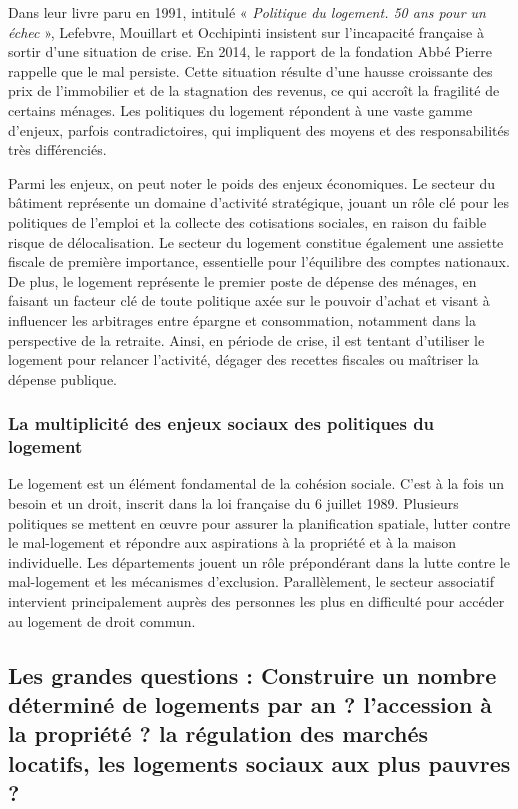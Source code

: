 \documentclass[a4paper, 12pt]{report}
\begin{document}
Dans leur livre paru en 1991, intitulé « \textit{Politique du logement. 50 ans pour un échec }», Lefebvre, Mouillart et Occhipinti insistent sur l’incapacité française à sortir d’une situation de crise. En 2014, le rapport de la fondation Abbé Pierre rappelle que le mal persiste. Cette situation résulte d’une hausse croissante des prix de l’immobilier et de la stagnation des revenus, ce qui accroît la fragilité de certains ménages. Les politiques du logement répondent à une vaste gamme d’enjeux, parfois contradictoires, qui impliquent des moyens et des responsabilités très différenciés.

Parmi les enjeux, on peut noter le poids des enjeux économiques. Le secteur du bâtiment représente un domaine d’activité stratégique, jouant un rôle clé pour les politiques de l’emploi et la collecte des cotisations sociales, en raison du faible risque de délocalisation. Le secteur du logement constitue également une assiette fiscale de première importance, essentielle pour l’équilibre des comptes nationaux. De plus, le logement représente le premier poste de dépense des ménages, en faisant un facteur clé de toute politique axée sur le pouvoir d’achat et visant à influencer les arbitrages entre épargne et consommation, notamment dans la perspective de la retraite. Ainsi, en période de crise, il est tentant d'utiliser le logement pour relancer l’activité, dégager des recettes fiscales ou maîtriser la dépense publique.

\subsubsection{La multiplicité des enjeux sociaux des politiques du logement}

Le logement est un élément fondamental de la cohésion sociale. C'est à la fois un besoin et un droit, inscrit dans la loi française du 6 juillet 1989. Plusieurs politiques se mettent en œuvre pour assurer la planification spatiale, lutter contre le mal-logement et répondre aux aspirations à la propriété et à la maison individuelle. Les départements jouent un rôle prépondérant dans la lutte contre le mal-logement et les mécanismes d’exclusion. Parallèlement, le secteur associatif intervient principalement auprès des personnes les plus en difficulté pour accéder au logement de droit commun.

\subsection{Les grandes questions : Construire un nombre déterminé de logements par an ? l’accession à la propriété ? la régulation des marchés locatifs, les logements sociaux aux plus pauvres ?}
\end{document}

